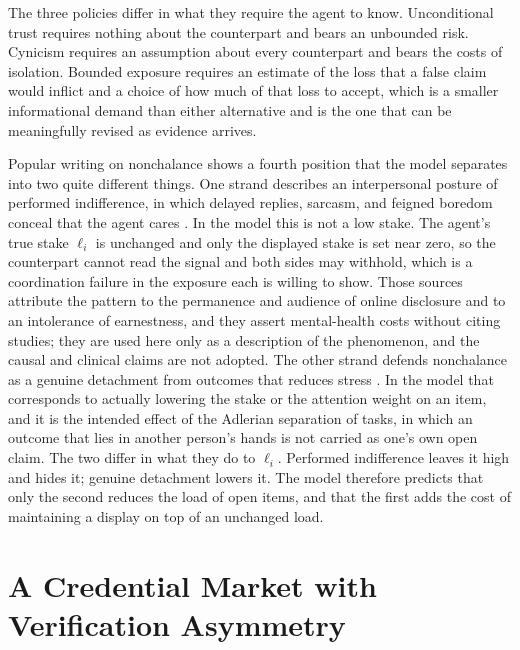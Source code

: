 \documentclass[11pt]{article}
\theoremstyle{definition}
\begin{document}
The three policies differ in what they require the agent to know. Unconditional trust requires nothing about the counterpart and bears an unbounded risk. Cynicism requires an assumption about every counterpart and bears the costs of isolation. Bounded exposure requires an estimate of the loss that a false claim would inflict and a choice of how much of that loss to accept, which is a smaller informational demand than either alternative and is the one that can be meaningfully revised as evidence arrives.

Popular writing on nonchalance shows a fourth position that the model separates into two quite different things. One strand describes an interpersonal posture of performed indifference, in which delayed replies, sarcasm, and feigned boredom conceal that the agent cares \cite{baltimore2025, providence2025}. In the model this is not a low stake. The agent's true stake $\ell_i$ is unchanged and only the displayed stake is set near zero, so the counterpart cannot read the signal and both sides may withhold, which is a coordination failure in the exposure each is willing to show. Those sources attribute the pattern to the permanence and audience of online disclosure and to an intolerance of earnestness, and they assert mental-health costs without citing studies; they are used here only as a description of the phenomenon, and the causal and clinical claims are not adopted. The other strand defends nonchalance as a genuine detachment from outcomes that reduces stress \cite{alwani}. In the model that corresponds to actually lowering the stake or the attention weight on an item, and it is the intended effect of the Adlerian separation of tasks, in which an outcome that lies in another person's hands is not carried as one's own open claim. The two differ in what they do to $\ell_i$. Performed indifference leaves it high and hides it; genuine detachment lowers it. The model therefore predicts that only the second reduces the load of open items, and that the first adds the cost of maintaining a display on top of an unchanged load.

\section{A Credential Market with Verification Asymmetry}
\label{sec:credential}
\end{document}
